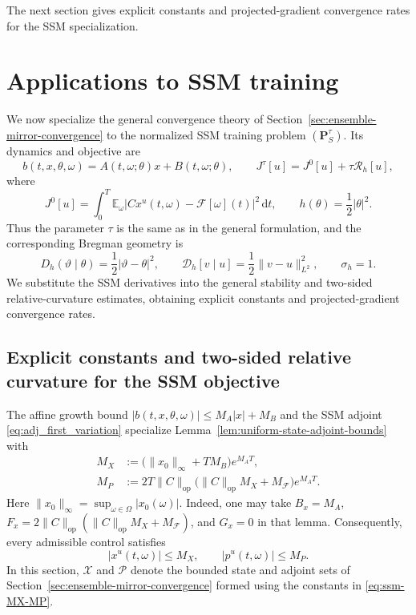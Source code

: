 \documentclass[11pt]{amsart}
\numberwithin{equation}{section} %
\newcommand{\dd}{\mathrm{d}}
\theoremstyle{remark}
\begin{document}
The next section gives explicit constants and projected-gradient
convergence rates for the SSM specialization.


\section{Applications to SSM training}
\label{sec:ssm-consequences}

We now specialize the general convergence theory of
Section~\ref{sec:ensemble-mirror-convergence} to the normalized SSM
training problem $(\mathbf P_S^\tau)$.  Its dynamics and objective are
\[
b(t,x,\theta,\omega)
=A(t,\omega;\theta)x+B(t,\omega;\theta),
\qquad
J^\tau[u]=J^0[u]+\tau\mathcal R_h[u],
\]
where
\[
J^0[u]=\int_0^T\mathbb E_\omega
|Cx^u(t,\omega)-\mathcal F[\omega](t)|^2\,\dd t,
\qquad h(\theta)=\frac12|\theta|^2.
\]
Thus the parameter $\tau$ is the same as in the general formulation,
and the corresponding Bregman geometry is
\begin{equation}
\label{eq:ssm-euclidean-geometry}
D_h(\vartheta\mid\theta)=\frac12|\vartheta-\theta|^2,
\qquad
\mathcal D_h[v\mid u]=\frac12\|v-u\|_{L^2}^2,
\qquad \sigma_h=1.
\end{equation}
We substitute the SSM derivatives into the general stability and
two-sided relative-curvature estimates, obtaining explicit constants
and projected-gradient convergence rates.

\subsection{Explicit constants and two-sided relative curvature for the SSM objective}
\label{subsec:ssm-relative-smoothness}

The affine growth bound
$|b(t,x,\theta,\omega)|\le M_A|x|+M_B$ and the SSM adjoint
\eqref{eq:adj_first_variation} specialize
Lemma~\ref{lem:uniform-state-adjoint-bounds} with
\begin{equation}
\label{eq:ssm-MX-MP}
\begin{aligned}
M_X&:=\bigl(\|x_0\|_\infty+TM_B\bigr)e^{M_AT},\\
M_P&:=2T\|C\|_{\mathrm{op}}\bigl(\|C\|_{\mathrm{op}}M_X+M_{\mathcal F}\bigr)e^{M_AT}.
\end{aligned}
\end{equation}
Here $\|x_0\|_\infty=\sup_{\omega\in\Omega}|x_0(\omega)|$.
Indeed, one may take $B_x=M_A$,
$F_x=2\|C\|_{\mathrm{op}}(\|C\|_{\mathrm{op}}M_X+M_{\mathcal F})$, and $G_x=0$ in that lemma.
Consequently, every admissible control satisfies
\begin{equation}
\label{eq:ssm-uniform-state-adjoint}
|x^u(t,\omega)|\le M_X,
\qquad |p^u(t,\omega)|\le M_P.
\end{equation}
In this section, $\mathcal X$ and $\mathcal P$ denote the bounded
state and adjoint sets of Section~\ref{sec:ensemble-mirror-convergence}
formed using the constants in \eqref{eq:ssm-MX-MP}.
\end{document}
